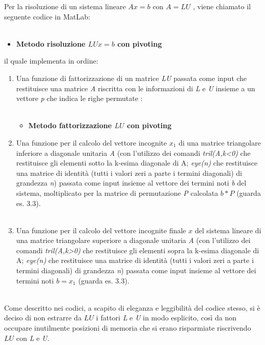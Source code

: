 Per la risoluzione di un sistema lineare $Ax=b$ con $A=LU$ , viene chiamato il seguente codice in MatLab:\\\
\begin{itemize}
\item \textbf{Metodo risoluzione $LUx=b$ con pivoting}

\end{itemize}
il quale implementa in ordine:
\begin{enumerate}
\item
Una funzione di fattorizzazione di un matrice \textit{LU} passata come input che restituisce una matrice \textit{A} riscritta con le informazioni di \textit{L} e \textit{U} insieme a un vettore \textit{p} che indica le righe permutate :\\\
\begin{itemize}
\item \textbf{Metodo fattorizzazione $LU$ con pivoting}

\end{itemize}
\item
Una funzione per il calcolo del vettore incognite $x_1$ di una matrice triangolare inferiore a diagonale unitaria \textit{A} (con l'utilizzo dei comandi \textit{tril(A,k<0)} che restituisce gli elementi sotto la k-esima diagonale di A; \textit{eye(n)} che restituisce una matrice di identità (tutti i valori zeri a parte i termini diagonali) di grandezza \textit{n}) passata come input insieme al vettore dei termini noti \textit{b} del sistema, moltiplicato per la matrice di permutazione \textit{P} calcolata $b*P$ (guarda es. 3.3). \\\
\item
Una funzione per il calcolo del vettore incognite finale $x$ del sistema lineare di una matrice triangolare superiore a diagonale unitaria \textit{A} (con l'utilizzo dei comandi \textit{tril(A,k>0)} che restituisce gli elementi sopra la k-esima diagonale di A; \textit{eye(n)} che restituisce una matrice di identità (tutti i valori zeri a parte i termini diagonali) di grandezza \textit{n}) passata come input insieme al vettore dei termini noti $b=x_1$ (guarda es. 3.3).\\\
\end{enumerate}
Come descritto nei codici, a scapito di eleganza e leggibilità del codice stesso, si è deciso di non estrarre da $LU$ i fattori \textit{L} e \textit{U} in modo esplicito, così da non occupare inutilmente posizioni di memoria che si erano risparmiate riscrivendo $LU$ con \textit{L} e \textit{U}.